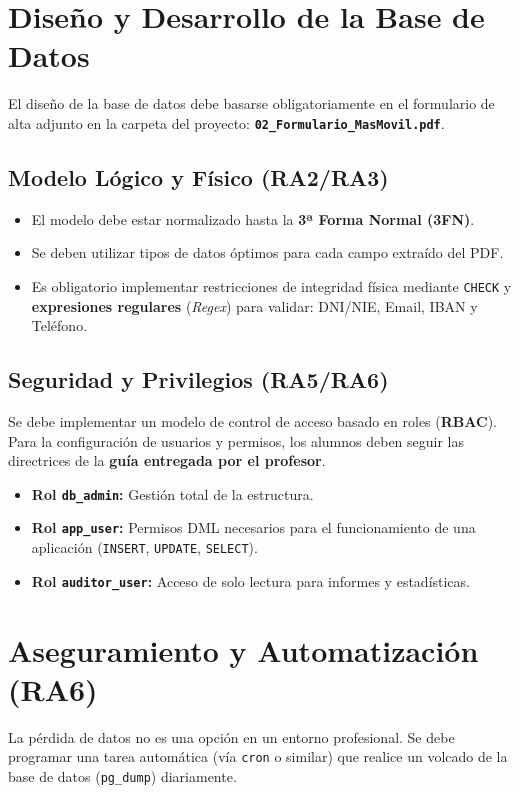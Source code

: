 \documentclass[12pt,a4paper,spanish,es-tabla,es-noshorthands]{article}
\begin{document}
\section{Diseño y Desarrollo de la Base de Datos}
El diseño de la base de datos debe basarse obligatoriamente en el formulario de alta adjunto en la carpeta del proyecto: \textbf{\texttt{02\_Formulario\_MasMovil.pdf}}. 

\subsection{Modelo Lógico y Físico (RA2/RA3)}
\begin{itemize}
    \item El modelo debe estar normalizado hasta la \textbf{3ª Forma Normal (3FN)}.
    \item Se deben utilizar tipos de datos óptimos para cada campo extraído del PDF.
    \item Es obligatorio implementar restricciones de integridad física mediante \texttt{CHECK} y \textbf{expresiones regulares} (\textit{Regex}) para validar: DNI/NIE, Email, IBAN y Teléfono.
\end{itemize}

\subsection{Seguridad y Privilegios (RA5/RA6)}
Se debe implementar un modelo de control de acceso basado en roles (\textbf{RBAC}). Para la configuración de usuarios y permisos, los alumnos deben seguir las directrices de la \textbf{guía entregada por el profesor}.
\begin{itemize}
    \item \textbf{Rol \texttt{db\_admin}:} Gestión total de la estructura.
    \item \textbf{Rol \texttt{app\_user}:} Permisos DML necesarios para el funcionamiento de una aplicación (\texttt{INSERT}, \texttt{UPDATE}, \texttt{SELECT}).
    \item \textbf{Rol \texttt{auditor\_user}:} Acceso de solo lectura para informes y estadísticas.
\end{itemize}

\section{Aseguramiento y Automatización (RA6)}
La pérdida de datos no es una opción en un entorno profesional. Se debe programar una tarea automática (vía \texttt{cron} o similar) que realice un volcado de la base de datos (\texttt{pg\_dump}) diariamente.
\end{document}
